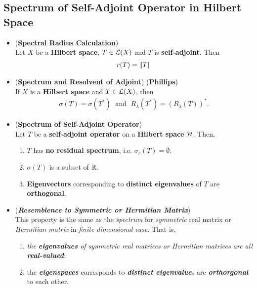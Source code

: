 \documentclass[11pt]{article}
\begin{document}
\subsection{Spectrum of Self-Adjoint Operator in Hilbert Space}
\begin{itemize}
\item \begin{proposition} (\textbf{Spectral Radius Calculation}) \citep{reed1980methods}\\
Let $X$ be a  \textbf{Hilbert space}, $T \in {\mathcal L}(X)$ and $T$ is \textbf{self-adjoint}. Then 
\begin{align*}
r(T) = \left\|T\right\|_{}
\end{align*}
\end{proposition}

\item \begin{theorem} (\textbf{Spectrum and Resolvent of Adjoint}) (\textbf{Phillips}) \citep{reed1980methods}\\ 
If $X$ is a \textbf{Hilbert space} and $T \in {\mathcal L}(X)$, then 
\begin{align*}
\sigma(T) = \sigma(T^{*})\; \text{ and }\; R_{\lambda}(T^{*}) = (R_{\lambda}(T))^{*}.
\end{align*}
\end{theorem}

\item \begin{proposition}  (\textbf{Spectrum of Self-Adjoint Operator}) \citep{reed1980methods}\\ 
Let $Τ$ be a \textbf{self-adjoint operator} on a \textbf{Hilbert space} ${\mathcal H}$. Then, 
\begin{enumerate}
\item $T$ has \textbf{no residual spectrum}, i.e. $\sigma_{r}(T) = \emptyset$. 
\item $\sigma(T)$ is a subset of ${\mathbb R}$. 
\item \textbf{Eigenvectors} corresponding to \textbf{distinct eigenvalues} of $T$ are \textbf{orthogonal}. 
\end{enumerate}
\end{proposition}

\item \begin{remark} (\emph{\textbf{Resemblence to Symmetric or Hermitian Matrix}})\\
This property is the same as the \emph{spectrum} for \emph{symmetric} real matrix or \emph{Hermitian matrix} in \emph{finite dimensional case}. That is, 
\begin{enumerate}
\item \emph{the \textbf{eigenvalues} of \emph{symmetric real matrices} or \emph{Hermitian matrices} are all \textbf{real-valued}}; 
\item the \emph{\textbf{eigenspaces}} corresponds to \emph{\textbf{distinct eigenvalue}}s are \emph{\textbf{orthorgonal}} to each other.
\end{enumerate} 
\end{remark}

\end{itemize}
\end{document}
